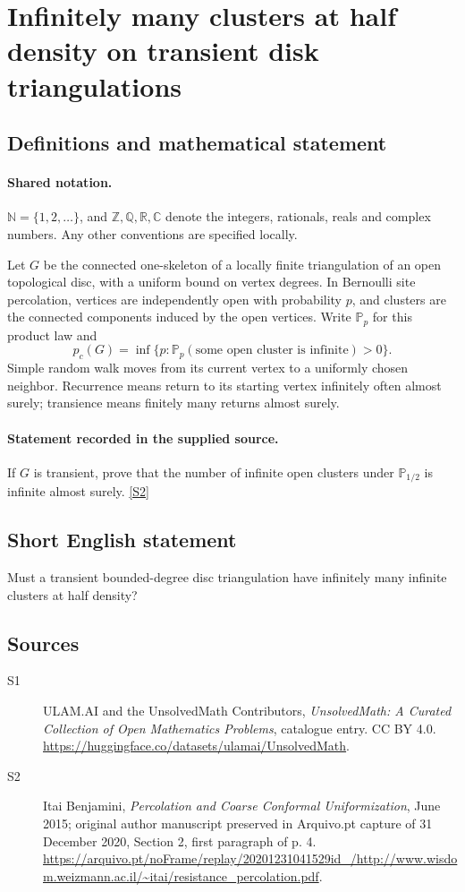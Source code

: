 \documentclass[11pt]{article}
\newcommand{\sref}[2]{\hyperlink{source:#1:#2}{[S#2]}}
\begin{document}
\section{Infinitely many clusters at half density on transient disk triangulations}\label{statement}

\subsection{Definitions and mathematical statement}

\paragraph{Shared notation.}$\mathbb N=\{1,2,\ldots\}$, and $\mathbb Z,\mathbb Q,\mathbb R,\mathbb C$ denote the integers, rationals, reals and complex numbers. Any other conventions are specified locally.


Let $G$ be the connected one-skeleton of a locally finite triangulation of an open topological disc, with a uniform bound on vertex degrees. In Bernoulli site percolation, vertices are independently open with probability $p$, and clusters are the connected components induced by the open vertices. Write $\mathbb P_p$ for this product law and
\[p_c(G)=\inf\{p:\mathbb P_p(\text{some open cluster is infinite})>0\}.\]
Simple random walk moves from its current vertex to a uniformly chosen neighbor. Recurrence means return to its starting vertex infinitely often almost surely; transience means finitely many returns almost surely.
\paragraph{Statement recorded in the supplied source.}
If $G$ is transient, prove that the number of infinite open clusters under $\mathbb P_{1/2}$ is infinite almost surely. \sref{statement}{2}
\subsection{Short English statement}
Must a transient bounded-degree disc triangulation have infinitely many infinite clusters at half density?
\subsection{Sources}
\begin{description}
\item[\hypertarget{source:statement:1}{S1}] ULAM.AI and the UnsolvedMath Contributors, \emph{UnsolvedMath: A Curated Collection of Open Mathematics Problems}, catalogue entry. CC BY 4.0. \url{https://huggingface.co/datasets/ulamai/UnsolvedMath}.
\item[\hypertarget{source:statement:2}{S2}] Itai Benjamini, \emph{Percolation and Coarse Conformal Uniformization}, June 2015; original author manuscript preserved in Arquivo.pt capture of 31 December 2020, Section 2, first paragraph of p. 4. \url{https://arquivo.pt/noFrame/replay/20201231041529id_/http://www.wisdom.weizmann.ac.il/~itai/resistance_percolation.pdf}.
\end{description}
\label{end:statement}
\end{document}
